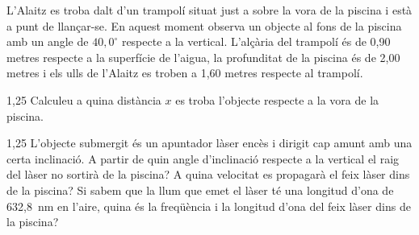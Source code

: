 L'Alaitz es troba dalt d'un trampolí situat just a sobre la vora de la piscina i està a punt de llançar-se. En aquest moment observa un objecte al fons de la piscina amb un angle de $40,0^\circ$ respecte a la vertical. L'alçària del trampolí és de 0,90 metres respecte a la superfície de l'aigua, la profunditat de la piscina és de 2,00 metres i els ulls de l'Alaitz es troben a 1,60 metres respecte al trampolí.


\begin{apartat}{1,25}
Calculeu a quina distància $x$ es troba l'objecte respecte a la vora de la piscina.
\end{apartat}

\begin{apartat}{1,25}
L'objecte submergit és un apuntador làser encès i dirigit cap amunt amb una certa inclinació. A partir de quin angle d'inclinació respecte a la vertical el raig del làser no sortirà de la piscina? A quina velocitat es propagarà el feix làser dins de la piscina? Si sabem que la llum que emet el làser té una longitud d'ona de 632,8~nm en l'aire, quina és la freqüència i la longitud d'ona del feix làser dins de la piscina?
\end{apartat}

